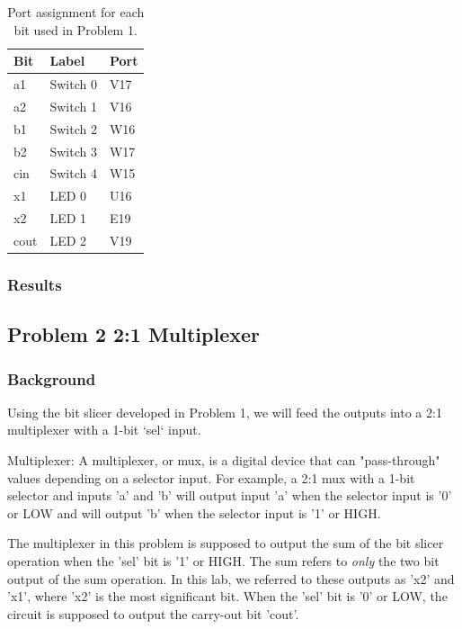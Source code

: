 \documentclass[11pt]{article}
\begin{document}
\begin{table}[H]
\begin{center}
	\begin{tabular}{| l | l | l |}
		\hline
		Bit & Label & Port \\ \hline
		a1 & Switch 0 & V17 \\ \hline
		a2 & Switch 1 & V16 \\ \hline
		b1 & Switch 2 & W16 \\ \hline
		b2 & Switch 3 & W17 \\ \hline
		cin & Switch 4 & W15 \\ \hline
		x1 & LED 0 & U16 \\ \hline
		x2 & LED 1 & E19 \\ \hline
		cout & LED 2 & V19 \\ \hline
	\end{tabular}
	\caption{\label{tab:slicerPinAssignments}Port assignment for each bit used in Problem 1.}
\end{center}
\end{table}

\subsubsection{Results}


\subsection{Problem 2 2:1 Multiplexer}

\subsubsection{Background}
Using the bit slicer developed in Problem 1, we will feed the outputs into a 2:1 multiplexer with a 1-bit `sel` input. 

\begin{definition}
	Multiplexer: A multiplexer, or mux, is a digital device that can "pass-through" values depending on a selector input. For example, a 2:1 mux with a 1-bit selector and inputs 'a' and 'b' will output input 'a' when the selector input is '0' or LOW and will output 'b' when the selector input is '1' or HIGH.
\end{definition}

The multiplexer in this problem is supposed to output the sum of the bit slicer operation when the 'sel' bit is '1' or HIGH. The sum refers to \textit{only} the two bit output of the sum operation. In this lab, we referred to these outputs as 'x2' and 'x1', where 'x2' is the most significant bit. When the 'sel' bit is '0' or LOW, the circuit is supposed to output the carry-out bit 'cout'. 
\end{document}
